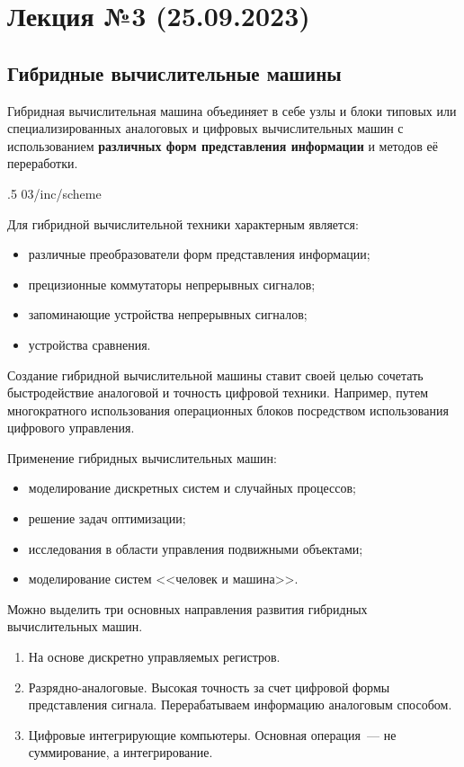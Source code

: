 \section{Лекция №3 (25.09.2023)}

\subsection{Гибридные вычислительные машины}

Гибридная вычислительная машина объединяет в себе узлы и блоки типовых или специализированных аналоговых и цифровых вычислительных машин с использованием \textbf{различных форм представления информации} и методов её переработки.

\image
{.5\textwidth}
{03/inc/scheme}
{}

Для гибридной вычислительной техники характерным является:

\begin{itemize}
    \item различные преобразователи форм представления информации;
    \item прецизионные коммутаторы непрерывных сигналов;
    \item запоминающие устройства непрерывных сигналов;
    \item устройства сравнения.
\end{itemize}

Создание гибридной вычислительной машины ставит своей целью сочетать быстродействие аналоговой и точность цифровой техники. Например, путем многократного использования операционных блоков посредством использования цифрового управления.

Применение гибридных вычислительных машин:

\begin{itemize}
    \item моделирование дискретных систем и случайных процессов;
    \item решение задач оптимизации;
    \item исследования в области управления подвижными объектами;
    \item моделирование систем <<человек и машина>>.
\end{itemize}

Можно выделить три основных направления развития гибридных вычислительных машин.

\begin{enumerate}
    \item На основе дискретно управляемых регистров.
    \item Разрядно-аналоговые. Высокая точность за счет цифровой формы представления сигнала. Перерабатываем информацию аналоговым способом.
    \item Цифровые интегрирующие компьютеры. Основная операция~--- не суммирование, а интегрирование.
\end{enumerate}


